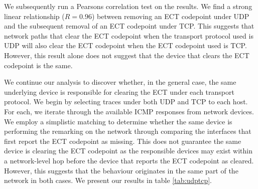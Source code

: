 \documentclass{l4proj}
\begin{document}
We subsequently run a Pearsons correlation test on the results. We find a strong linear relationship ($ R=0.96 $) between removing an ECT codepoint under UDP and the subsequent removal of an ECT codepoint under TCP. This suggests that network paths that clear the ECT codepoint when the transport protocol used is UDP will also clear the ECT codepoint when the ECT codepoint used is TCP. However, this result alone does not suggest that the device that clears the ECT codepoint is the same.

We continue our analysis to discover whether, in the general case, the same underlying device is responsible for clearing the ECT under each transport protocol. We begin by selecting traces under both UDP and TCP to each host. For each, we iterate through the available ICMP responses from network devices. We employ a simplistic matching to determine whether the same device is performing the remarking on the network through comparing the interfaces that first report the ECT codepoint as missing. This does not guarantee the same device is clearing the ECT codepoint as the responsible devices may exist within a network-level hop before the device that reports the ECT codepoint as cleared. However, this suggests that the behaviour originates in the same part of the network in both cases. We present our results in table \ref{tab:udptcp}.
\end{document}
